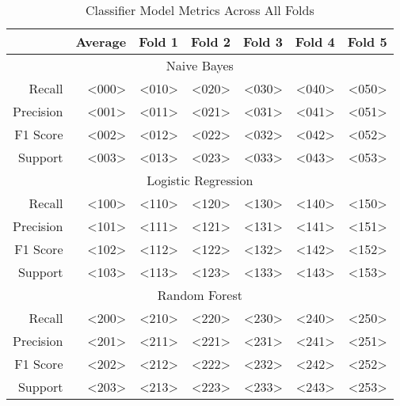 \begin{table}[h]
    \centering
    \begin{tabular}{r|r|r|r|r|r|r}
        & Average & Fold 1 & Fold 2 & Fold 3 & Fold 4 & Fold 5 \\\hline
        \multicolumn{7}{c}{Naive Bayes} \\\hline
        Recall      & <000> & <010> & <020> & <030> & <040> & <050> \\
        Precision   & <001> & <011> & <021> & <031> & <041> & <051> \\
        F1 Score    & <002> & <012> & <022> & <032> & <042> & <052> \\
        Support     & <003> & <013> & <023> & <033> & <043> & <053> \\\hline
        \multicolumn{7}{c}{Logistic Regression} \\\hline
        Recall      & <100> & <110> & <120> & <130> & <140> & <150> \\
        Precision   & <101> & <111> & <121> & <131> & <141> & <151> \\
        F1 Score    & <102> & <112> & <122> & <132> & <142> & <152> \\
        Support     & <103> & <113> & <123> & <133> & <143> & <153> \\\hline
        \multicolumn{7}{c}{Random Forest} \\\hline
        Recall      & <200> & <210> & <220> & <230> & <240> & <250> \\
        Precision   & <201> & <211> & <221> & <231> & <241> & <251> \\
        F1 Score    & <202> & <212> & <222> & <232> & <242> & <252> \\
        Support     & <203> & <213> & <223> & <233> & <243> & <253> \\\hline
    \end{tabular}
    \caption{Classifier Model Metrics Across All Folds}
    \label{tab:combined_fold_metrics}
\end{table}